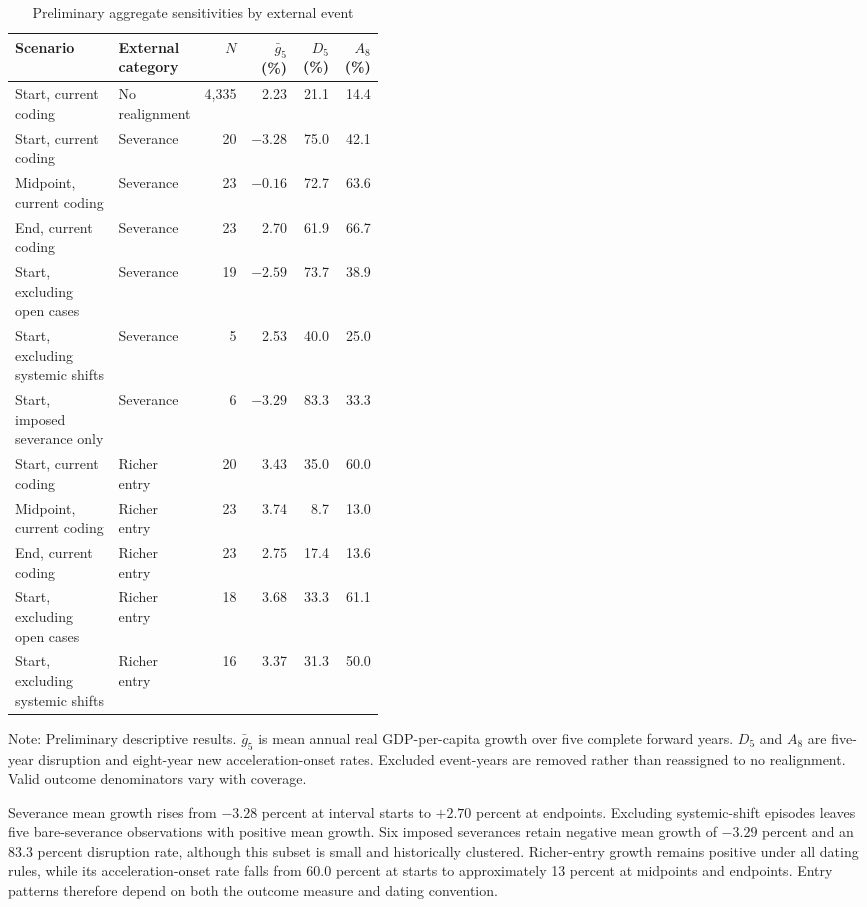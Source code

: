 \documentclass[11pt]{article}
\begin{document}
\begin{table}[H]
\centering
\begin{threeparttable}
\caption{Preliminary aggregate sensitivities by external event}
\label{tab:sensitivity}
\small
\begin{tabular}{@{}p{0.28\linewidth}p{0.15\linewidth}rrrr@{}}
\toprule
Scenario & External category & $N$ & $\bar g_5$ (\%) & $D_5$ (\%) & $A_8$ (\%) \\
\midrule
Start, current coding & No realignment & 4,335 & 2.23 & 21.1 & 14.4 \\
Start, current coding & Severance & 20 & $-3.28$ & 75.0 & 42.1 \\
Midpoint, current coding & Severance & 23 & $-0.16$ & 72.7 & 63.6 \\
End, current coding & Severance & 23 & 2.70 & 61.9 & 66.7 \\
Start, excluding open cases & Severance & 19 & $-2.59$ & 73.7 & 38.9 \\
Start, excluding systemic shifts & Severance & 5 & 2.53 & 40.0 & 25.0 \\
Start, imposed severance only & Severance & 6 & $-3.29$ & 83.3 & 33.3 \\
\midrule
Start, current coding & Richer entry & 20 & 3.43 & 35.0 & 60.0 \\
Midpoint, current coding & Richer entry & 23 & 3.74 & 8.7 & 13.0 \\
End, current coding & Richer entry & 23 & 2.75 & 17.4 & 13.6 \\
Start, excluding open cases & Richer entry & 18 & 3.68 & 33.3 & 61.1 \\
Start, excluding systemic shifts & Richer entry & 16 & 3.37 & 31.3 & 50.0 \\
\bottomrule
\end{tabular}
\begin{tablenotes}
\scriptsize
\item Note: Preliminary descriptive results. $\bar g_5$ is mean annual real GDP-per-capita growth over five complete forward years. $D_5$ and $A_8$ are five-year disruption and eight-year new acceleration-onset rates. Excluded event-years are removed rather than reassigned to no realignment. Valid outcome denominators vary with coverage.
\end{tablenotes}
\end{threeparttable}
\end{table}

Severance mean growth rises from $-3.28$ percent at interval starts to $+2.70$ percent at endpoints. Excluding systemic-shift episodes leaves five bare-severance observations with positive mean growth. Six imposed severances retain negative mean growth of $-3.29$ percent and an 83.3 percent disruption rate, although this subset is small and historically clustered. Richer-entry growth remains positive under all dating rules, while its acceleration-onset rate falls from 60.0 percent at starts to approximately 13 percent at midpoints and endpoints. Entry patterns therefore depend on both the outcome measure and dating convention.
\end{document}
